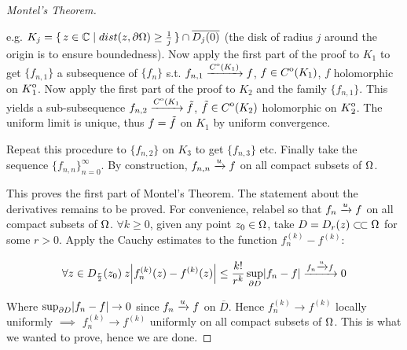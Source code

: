 \begin{proof}[Montel's Theorem]
\begin{center}
\end{center}





e.g. $K_j = \set{ z \in \mathbb{C}\mid dist(z,\partial \Omega) \geq \frac{1}{j} } \cap \overline{D_j(0)}$ (the disk of radius $j$ around the origin is to ensure boundedness). Now apply the first part of the proof to $K_1$ to get $\{ f_{n,1} \} $ a subsequence of $\{f_n\}$ s.t. $ f_{n,1}  \xrightarrow[]{{\kern0ptC}^{\mathrm{o}}(K_1)} f$, $f \in {\kern0ptC}^{\mathrm{o}} (K_1)$, $f$ holomorphic on ${\kern0ptK}^{\mathrm{o}}_{1}$. Now apply the first part of the proof to $K_2$ and the family $\{ f_{n,1} \}$. This yields a sub-subsequence $f_{n,2} \xrightarrow[]{{\kern0ptC}^{\mathrm{o}}(K_1} \Tilde{f}$, $\Tilde{f} \in {\kern0ptC}^{\mathrm{o}}(K_2)$ holomorphic on ${\kern0ptK}^{\mathrm{o}}_{2}$. The uniform limit is unique, thus $f = \Tilde{f}$ on $K_1$ by uniform convergence.

Repeat this procedure to $\{ f_{n,2} \}$ on $K_3$ to get $\{ f_{n,3} \}$ etc. Finally take the sequence $\{ f_{n,n} \}_{n=0}^\infty$. By construction, $f_{n,n} \xrightarrow[]{u} f$ on all compact subsets of $\Omega$.


This proves the first part of Montel's Theorem. The statement about the derivatives remains to be proved. For convenience, relabel so that $f_n \xrightarrow[]{u} f$ on all compact subsets of $\Omega$. $\forall k \geq 0$, given any point $z_0 \in \Omega$, take $D = D_r(z) \ssubset \om$ for some $ r> 0$. Apply the Cauchy estimates to the function $f_n^{(k)} - f^{(k)}$:

\begin{align*}
    \forall z \in D_{\frac{r}{2}} (z_0) 
    \: z\abs{f_n^{(k)}(z) - f^{(k)} (z) } \leq \frac{k!}{r^k} \sup_{\partial D} \abs{f_n - f} \xrightarrow[]{f_n \xrightarrow[]{u} f} 0\\
\end{align*}

Where $\sup_{\partial D} \abs{f_n - f} \to 0$ since $f_n \xrightarrow[]{u} f$ on $\overline{D}$. Hence $f_n^{(k)} \to f^{(k)}$ locally uniformly $\implies$ $f_n^{(k)} \to f^{(k)}$ uniformly on all compact subsets of $\Omega$. This is what we wanted to prove, hence we are done.

\end{proof}


